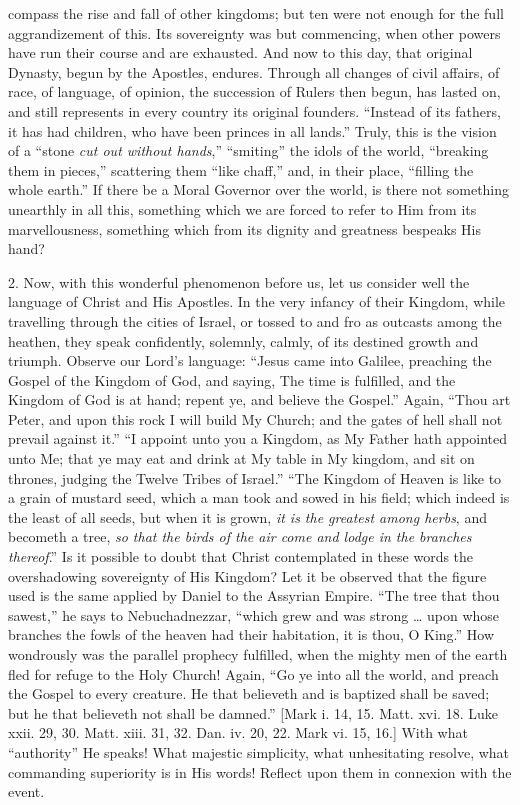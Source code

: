 compass the rise and fall of other kingdoms; but ten were not enough for
the full aggrandizement of this. Its sovereignty was but commencing,
when other powers have run their course and are exhausted. And now to
this day, that original Dynasty, begun by the Apostles, endures. Through
all changes of civil affairs, of race, of language, of opinion, the
succession of Rulers then begun, has lasted on, and still represents in
every country its original founders. ``Instead of its fathers, it
has had children, who have been princes in all lands.'' Truly, this
is the vision of a ``stone \emph{cut out without hands},''
``smiting'' the idols of the world, ``breaking them in
pieces,'' scattering them ``like chaff,'' and, in their
place, ``filling the whole earth.'' If there be a Moral Governor
over the world, is there not something unearthly in all this, something
which we are forced to refer to Him from its marvellousness, something
which from its dignity and greatness bespeaks His hand?

2. Now, with this wonderful phenomenon before us, let us consider
well the language of Christ and His Apostles. In the very infancy of
their Kingdom, while travelling through the cities of Israel, or tossed
to and fro as outcasts among the heathen, they speak confidently,
solemnly, calmly, of its destined growth and triumph. Observe our Lord's
language: ``Jesus came into Galilee, preaching the Gospel of the
Kingdom of God, and saying, The time is fulfilled, and the Kingdom of
God is at hand; repent ye, and believe the Gospel.'' Again,
``Thou art Peter, and upon this rock I will build My Church; and the
gates of hell shall not prevail against it.'' ``I appoint unto
you a Kingdom, as My Father hath appointed unto Me; that ye may eat and
drink at My table in My kingdom, and sit on thrones, judging the Twelve
Tribes of Israel.'' ``The Kingdom of Heaven is like to a grain
of mustard seed, which a man took and sowed in his field; which indeed
is the least of all seeds, but when it is grown, \emph{it is the greatest
among herbs}, and becometh a tree, \emph{so that the birds of the air
come and lodge in the branches thereof}.'' Is it possible to
doubt that Christ contemplated in these words the overshadowing
sovereignty of His Kingdom? Let it be observed that the figure used is
the same applied by Daniel to the Assyrian Empire. ``The tree that
thou sawest,'' he says to Nebuchadnezzar, ``which grew and was
strong … upon whose branches the fowls of the heaven had their
habitation, it is thou, O King.'' How wondrously was the parallel
prophecy fulfilled, when the mighty men of the earth fled for refuge to
the Holy Church! Again, ``Go ye into all the world, and preach the
Gospel to every creature. He that believeth and is baptized shall be
saved; but he that believeth not shall be damned.'' [Mark i. 14, 15.
Matt. xvi. 18. Luke xxii. 29, 30. Matt. xiii. 31, 32. Dan. iv. 20, 22.
Mark vi. 15, 16.] With what ``authority'' He speaks! What
majestic simplicity, what unhesitating resolve, what commanding
superiority is in His words! Reflect upon them in connexion with the
event.

